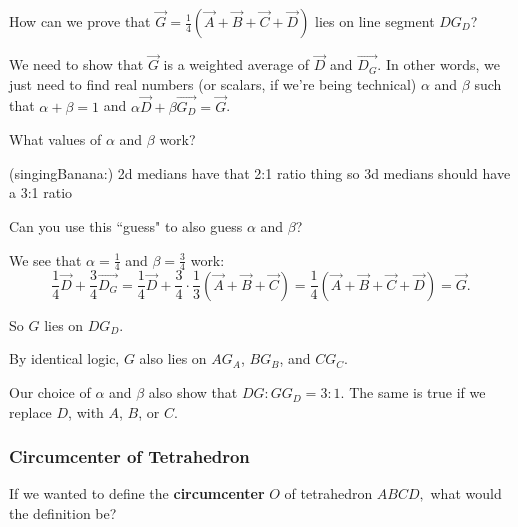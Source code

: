 How can we prove that $\vec{G}=\frac{1}{4}(\vec{A}+\vec{B}+\vec{C}+\vec{D})$ lies on line segment $DG_D$?

We need to show that $\vec{G}$ is a weighted average of $\vec{D}$ and $\vec{D_G}.$ In other words, we just need to find real numbers (or scalars, if we're being technical) $\alpha$ and $\beta$ such that $\alpha + \beta = 1$ and $\alpha \vec{D} + \beta \vec{G_D} = \vec{G}$.

What values of $\alpha$ and $\beta$ work?

(singingBanana:) 2d medians have that 2:1 ratio thing so 3d medians should have a 3:1 ratio

Can you use this ``guess" to also guess $\alpha$ and $\beta$?





We see that $\alpha = \frac{1}{4}$ and $\beta = \frac{3}{4}$ work:
$$ \frac{1}{4}\vec{D} + \frac{3}{4}\vec{D_G} = \frac{1}{4}\vec{D} + \frac{3}{4}\cdot \frac{1}{3}(\vec{A}+\vec{B}+\vec{C}) = \frac{1}{4}(\vec{A}+\vec{B}+\vec{C}+\vec{D}) = \vec{G}. $$

So $G$ lies on $DG_D$.

By identical logic, $G$ also lies on $AG_A$, $BG_B$, and $CG_C$.

Our choice of $\alpha$ and $\beta$ also show that $DG: G G_D = 3:1.$ The same is true if we replace $D$, with $A$, $B$, or $C$.

\subsubsection{Circumcenter of Tetrahedron}
If we wanted to define the \textbf{circumcenter} $O$ of tetrahedron $ABCD,$ what would the definition be?

